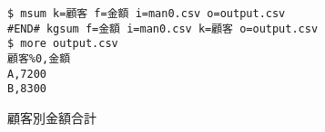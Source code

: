 \begin{figure}[htbp]
\begin{Verbatim}[baselinestretch=0.7,frame=single]
$ msum k=顧客 f=金額 i=man0.csv o=output.csv
#END# kgsum f=金額 i=man0.csv k=顧客 o=output.csv
$ more output.csv
顧客%0,金額
A,7200
B,8300
\end{Verbatim}
\caption{顧客別金額合計\label{fig:abstract1_1}}
\end{figure}
